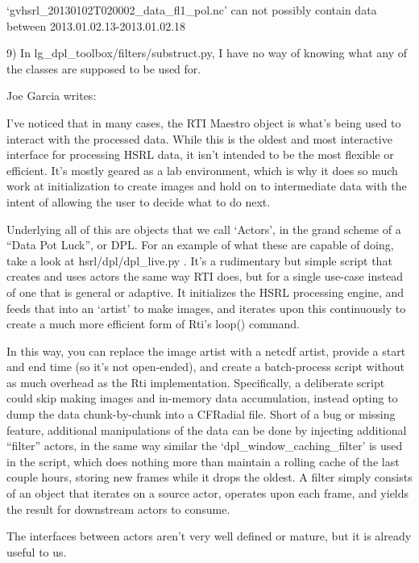  ‘gvhsrl\_20130102T020002\_data\_fl1\_pol.nc’ can not possibly contain data between 2013.01.02.13-2013.01.02.18

 9) In lg\_dpl\_toolbox/filters/substruct.py, I have no way of knowing what any of the classes are supposed to be used for.
\newline
\newline


Joe Garcia writes:

I’ve noticed that in many cases, the RTI Maestro object is what’s being used to interact with the processed data.  While this is the oldest and most interactive interface for processing HSRL data, it isn’t intended to be the most flexible or efficient. It’s mostly geared as a lab environment, which is why it does so much work at initialization to create images and hold on to intermediate data with the intent of allowing the user to decide what to do next.

Underlying all of this are objects that we call ‘Actors’, in the grand scheme of a “Data Pot Luck”, or DPL.  For an example of what these are capable of doing, take a look at hsrl/dpl/dpl\_live.py . It’s a rudimentary but simple script that creates and uses actors the same way RTI does, but for a single use-case instead of one that is general or adaptive.  It initializes the HSRL processing engine, and feeds that into an ‘artist’ to make images, and iterates upon this continuously to create a much more efficient form of Rti’s loop() command.

In this way, you can replace the image artist with a netcdf artist, provide a start and end time (so it’s not open-ended), and create a batch-process script without as much overhead as the Rti implementation.  Specifically, a deliberate script could skip making images and in-memory data accumulation, instead opting to dump the data chunk-by-chunk into a CFRadial file. Short of a bug or missing feature, additional manipulations of the data can be done by injecting additional “filter” actors, in the same way similar the ‘dpl\_window\_caching\_filter’ is used in the script, which does nothing more than maintain a rolling cache of the last couple hours, storing new frames while it drops the oldest. A filter simply consists of an object that iterates on a source actor, operates upon each frame, and yields the result for downstream actors to consume.

The interfaces between actors aren’t very well defined or mature, but it is already useful to us.

